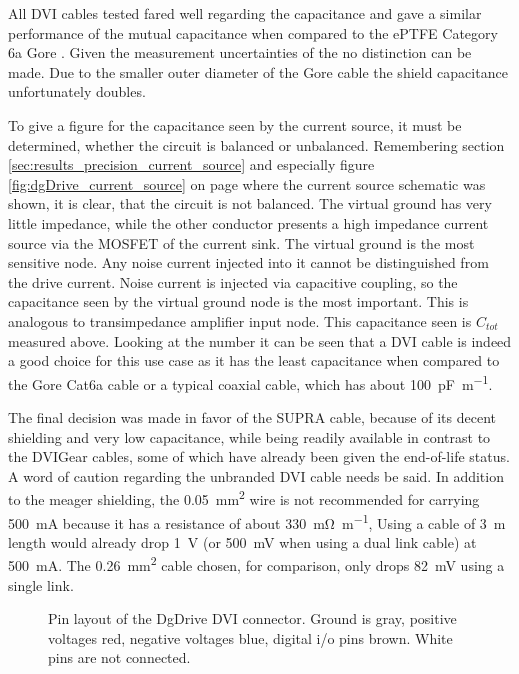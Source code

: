 All DVI cables tested fared well regarding the capacitance and gave a similar performance of the mutual capacitance when compared to the ePTFE Category 6a Gore . Given the measurement uncertainties of the  no distinction can be made. Due to the smaller outer diameter of the Gore cable the shield capacitance unfortunately doubles.%

To give a figure for the capacitance seen by the current source, it must be determined, whether the circuit is balanced or unbalanced. Remembering section \ref{sec:results_precision_current_source} and especially figure \ref{fig:dgDrive_current_source} on page \pageref{fig:dgDrive_current_source} where the current source schematic was shown, it is clear, that the circuit is not balanced. The virtual ground has very little impedance, while the other conductor presents a high impedance current source via the MOSFET of the current sink. The virtual ground is the most sensitive node. Any noise current injected into it cannot be distinguished from the drive current. Noise current is injected via capacitive coupling, so the capacitance seen by the virtual ground node is the most important. This is analogous to transimpedance amplifier input node. This capacitance seen is $C_{tot}$ measured above. Looking at the number it can be seen that a DVI cable is indeed a good choice for this use case as it has the least capacitance when compared to the Gore Cat6a cable or a typical coaxial cable, which has about \qty{100}{\pF \per \m}.

The final decision was made in favor of the SUPRA  cable, because of its decent shielding and very low capacitance, while being readily available in contrast to the DVIGear cables, some of which have already been given the end-of-life status.
A word of caution regarding the unbranded DVI cable needs be said. In addition to the meager shielding, the \qty{0.05}{\square\mm} wire is not recommended for carrying  \qty{500}{\mA} because it has a resistance of about \qty{330}{\milli\ohm \per \m}, Using a cable of \qty{3}{\m} length would already drop \qty{1}{\V} (or \qty{500}{\mV} when using a dual link cable) at \qty{500}{\mA}. The \qty{0.26}{\square\mm} cable chosen, for comparison, only drops \qty{82}{\mV} using a single link.
\begin{figure}[ht]
    \centering
    \caption{Pin layout of the DgDrive DVI connector. Ground is gray, positive voltages red, negative voltages blue, digital i/o pins brown. White pins are not connected.}
    \label{fig:dvi_connector_pin_layout}
\end{figure}

